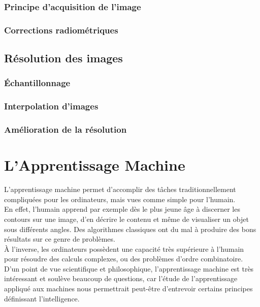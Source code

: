 \documentclass[10pt,a4paper]{report}
\begin{document}
			\subsection{Principe d'acquisition de l'image}
			\subsection{Corrections radiométriques}
		\section{Résolution des images}
			\subsection{Échantillonnage}
			\subsection{Interpolation d'images}
			\subsection{Amélioration de la résolution}
	\chapter{L'Apprentissage Machine}
	L'apprentissage machine permet d'accomplir des tâches traditionnellement compliquées pour les ordinateurs, mais vues comme simple pour l'humain.\\
	En effet, l'humain apprend par exemple dès le plus jeune âge à discerner les contours sur une image, d'en décrire le contenu et même de visualiser un objet sous différents angles. Des algorithmes classiques ont du mal à produire des bons résultats sur ce genre de problèmes.\\
	À l'inverse, les ordinateurs possèdent une capacité très supérieure à l'humain pour résoudre des calculs complexes, ou des problèmes d'ordre combinatoire.\\
	D'un point de vue scientifique et philosophique, l'apprentissage machine est très intéressant et soulève beaucoup de questions, car l'étude de l'apprentissage appliqué aux machines nous permettrait peut-être d'entrevoir certains principes définissant l'intelligence.
\end{document}
